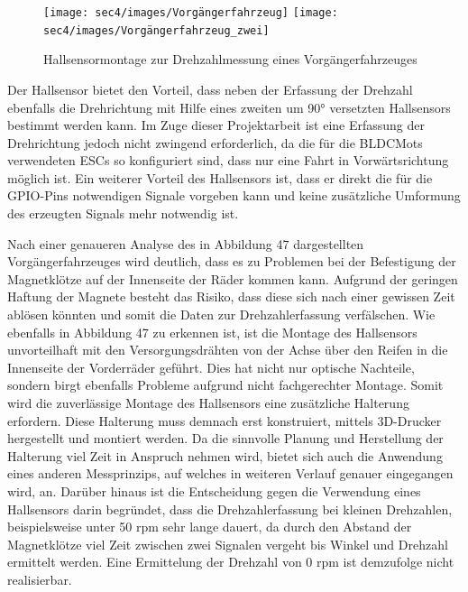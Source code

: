 \begin{figure}[H] %
\texttt{[image: sec4/images/Vorgängerfahrzeug]} 
\texttt{[image: sec4/images/Vorgängerfahrzeug\_zwei]} 
\captionsetup{width=.95\textwidth}
\centering
\caption[Vorgängerfahrzeug]{Hallsensormontage zur Drehzahlmessung eines Vorgängerfahrzeuges}\centering
\label{fig:Vorgängerfahrzeug}
\end{figure}     


Der Hallsensor bietet den Vorteil, dass neben der Erfassung der Drehzahl ebenfalls die Drehrichtung mit Hilfe eines zweiten um 90° versetzten Hallsensors bestimmt werden kann. Im Zuge dieser Projektarbeit ist eine Erfassung der Drehrichtung jedoch nicht zwingend erforderlich, da die für die \acp{BLDCMot} verwendeten \ac{ESC}s so konfiguriert sind, dass nur eine Fahrt in Vorwärtsrichtung möglich ist. Ein weiterer Vorteil des Hallsensors ist, dass er direkt die für die GPIO-Pins notwendigen Signale vorgeben kann und keine zusätzliche Umformung des erzeugten Signals mehr notwendig ist. \vspace{11pt}

Nach einer genaueren Analyse des in Abbildung 47 dargestellten Vorgängerfahrzeuges wird deutlich, dass es zu Problemen bei der Befestigung der Magnetklötze auf der Innenseite der Räder kommen kann. Aufgrund der geringen Haftung der Magnete besteht das Risiko, dass diese sich nach einer gewissen Zeit ablösen könnten und somit die Daten zur Drehzahlerfassung verfälschen. Wie ebenfalls in Abbildung 47 zu erkennen ist, ist die Montage des Hallsensors unvorteilhaft mit den Versorgungsdrähten von der Achse über den Reifen in die Innenseite der Vorderräder geführt. Dies hat nicht nur optische Nachteile, sondern birgt ebenfalls Probleme aufgrund nicht fachgerechter Montage. Somit wird die zuverlässige Montage des Hallsensors eine zusätzliche Halterung erfordern. Diese Halterung muss demnach erst konstruiert, mittels 3D-Drucker hergestellt und montiert werden. Da die sinnvolle Planung und Herstellung der Halterung viel Zeit in Anspruch nehmen wird, bietet sich auch die Anwendung eines anderen Messprinzips, auf welches in weiteren Verlauf genauer eingegangen wird, an. Darüber hinaus ist die Entscheidung gegen die Verwendung eines Hallsensors darin begründet, dass die Drehzahlerfassung bei kleinen Drehzahlen, beispielsweise unter 50 rpm sehr lange dauert, da durch den Abstand der Magnetklötze viel Zeit zwischen zwei Signalen vergeht bis Winkel und Drehzahl ermittelt werden. Eine Ermittelung der Drehzahl von 0 rpm ist demzufolge nicht realisierbar. \vspace{11pt}


